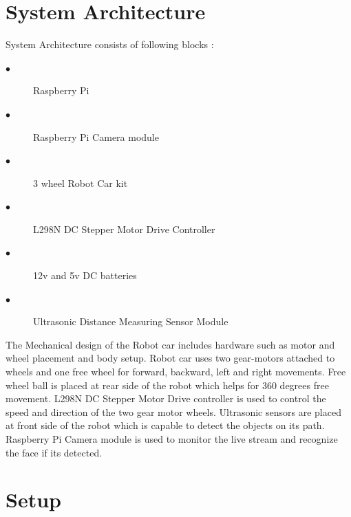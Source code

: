 \documentclass[sigconf]{acmart}
\begin{document}
\section{System Architecture}
System Architecture consists of following blocks :
\begin{description}
    \item[$\bullet$] Raspberry Pi

    \item[$\bullet$] Raspberry Pi Camera module 

    \item[$\bullet$] 3 wheel Robot Car kit

    \item[$\bullet$] L298N DC Stepper Motor Drive Controller 

    \item[$\bullet$] 12v and 5v DC batteries
    
    \item[$\bullet$] Ultrasonic Distance Measuring Sensor Module 
    
\end{description}

The Mechanical design of the Robot car includes hardware such as motor and wheel placement and body setup. Robot car uses two gear-motors attached to wheels and one free wheel for forward, backward, left and right movements. Free wheel ball is placed at rear side of the robot which helps for 360 degrees free movement. L298N DC Stepper Motor Drive controller is used to control the speed and direction of the two gear motor wheels. Ultrasonic sensors are placed at front side of the robot which is capable to detect the objects on its path. Raspberry Pi Camera module is used to monitor the live stream and recognize the face if its detected.

\section{Setup}
\end{document}
